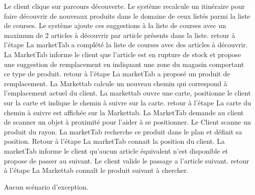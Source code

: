 \alternatifs
\startalternatif[UGM:SA1]
\etape Le client clique sur parcours découverte.
\etape Le système recalcule un itinéraire pour faire découvrir de nouveaux produits dans le domaine de ceux listés parmi la liste de courses. Le système ajoute ces suggestions à la liste de courses avec un maximum de 2 articles à découvrir par article présents dans la liste.
\etape retour à l'étape 
\stopcondition
\postcondition La marketTab a complété la liste de courses avec des articles à découvrir.
\stopalternatif
\startalternatif[UGM:SA1]
\etape La MarketTab informe le client que l'article est en rupture de stock et propose une suggestion de remplacement en indiquant une zone du magasin comportant ce type de produit.
\etape retour à l'étape 
\stopcondition
\postcondition La marketTab a proposé un produit de remplacement.
\stopalternatif
{}
\etape La Markettab calcule un nouveau chemin qui correspond à l'emplacement actuel du client. 
\etape La markettab ouvre une carte, positionne le client sur la carte et indique le chemin à suivre sur la carte.
\etape retour à l'étape 
\stopcondition
\postcondition La carte du chemin à suivre est affichée sur la Markettab.
\stopalternatif
\startalternatif[UGM:SA1]
\etape La MarketTab demande au client de scanner un objet à proximité pour l'aider à se positionner. 
\etape Le Client scanne un produit du rayon.
\etape La marketTab recherche ce produit dans le plan et définit sa position.
\etape Retour à l'étape \in[UGM:SA1]
\stopcondition
\postcondition La marketTab connait la position du client.
\stopalternatif
\startalternatif[UGM:SA1]
  \etape La marketTab informe le client qu'aucun article équivalent n'est disponible et propose de passer au suivant.
  \etape Le client valide le passage a l'article suivant.
  \etape retour à l'étape 
\stopcondition
\postcondition La Markettab connaît le produit suivant à chercher.
\stopalternatif

\exception
Aucun scénario d'exception.

\stopCU
